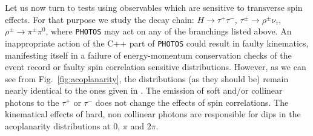 \documentclass[]{Photos_interface_design}
\begin{document}
Let us now turn to tests using observables which are sensitive to
transverse spin effects.  For that purpose we study the decay chain:
$H\to \tau^+\tau^-$, $\tau^\pm \to \rho^\pm \nu_\tau$, $\rho^\pm \to
\pi^\pm \pi^0$, where {\tt PHOTOS} may act on any of the branchings
listed above. An inappropriate action of the C++ part of {\tt PHOTOS}
could result in faulty kinematics, manifesting itself in a failure of
energy-momentum conservation checks of the event record or faulty spin
correlation sensitive distributions. However, as we can see from Fig.~\ref{fig:acoplanarity},
 the distributions (as they should be) remain nearly identical to the ones given in
\cite{tauolaC++,Davidson:2010rw}. The emission of soft and/or
collinear photons to the $\tau^+$ or $\tau^-$ does not change the
effects of spin correlations. The kinematical effects of hard,
non collinear  photons are responsible for dips in 
the acoplanarity distributions at $0$, $\pi$ and $2\pi$.
\end{document}
